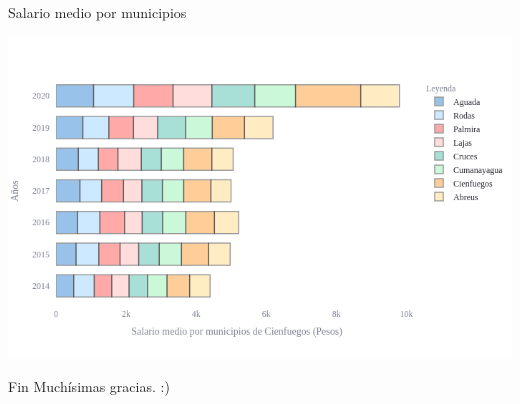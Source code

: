 \documentclass{beamer}
\begin{document}
\begin{frame}
    \begin{block}{Salario medio por municipios}
        \begin{center}
            \includegraphics[width=1.0\textwidth]{img/fig7.png}
        \end{center}
    \end{block}
\end{frame}

\begin{frame}
\begin{block}{Fin}
    Muchísimas gracias. :)
\end{block}
\end{frame}
\end{document}
